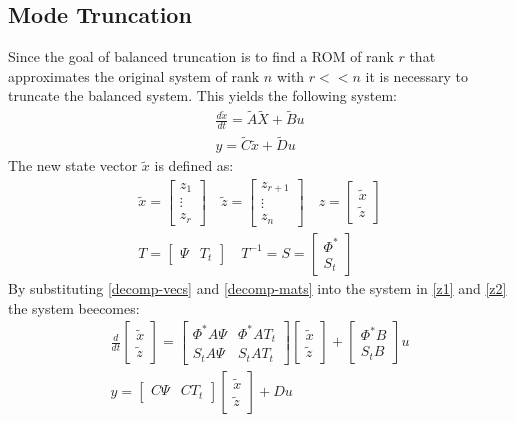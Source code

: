 \subsection{Mode Truncation}
Since the goal of balanced truncation is to find a ROM of rank \(r\) that approximates the original system of rank \(n\) with \(r << n\) it is necessary to truncate the balanced system.
This yields the following system:
\begin{gather}
\frac{d\tilde{x}}{dt} = \tilde{A}\tilde{X} + \tilde{B}u \\
y = \tilde{C}\tilde{x} + \tilde{D}u
\end{gather}
The new state vector \(\tilde{x}\) is defined as:
\begin{gather}
\tilde{x} = \begin{bmatrix}
z_1 \\
\vdots \\
z_r
\end{bmatrix} \quad 
\tilde{z} = \begin{bmatrix}
z_{r+1} \\
\vdots \\
z_n
\end{bmatrix} \quad
z = \begin{bmatrix}
\tilde{x} \\
\tilde{z}
\end{bmatrix} \label{decomp-vecs}\\
T = \begin{bmatrix}
\Psi & T_t
\end{bmatrix} \quad
T^{-1} = S = \begin{bmatrix}
\Phi^{*} \\
S_t
\end{bmatrix} \label{decomp-mats}
\end{gather}
By substituting \ref{decomp-vecs} and \ref{decomp-mats} into the system in \ref{z1} and \ref{z2} the system beecomes:
\begin{gather}
\frac{d}{dt} \begin{bmatrix}
\tilde{x} \\
\tilde{z}
\end{bmatrix} = \begin{bmatrix}
\Phi^{*}A\Psi & \Phi^{*}AT_t \\
S_tA\Psi & S_tAT_t
\end{bmatrix} \begin{bmatrix}
\tilde{x} \\
\tilde{z}
\end{bmatrix}
+ \begin{bmatrix}
\Phi^{*}B \\
S_tB
\end{bmatrix} u \\
y = \begin{bmatrix}
C \Psi & CT_t
\end{bmatrix} \begin{bmatrix}
\tilde{x} \\
\tilde{z}
\end{bmatrix} + Du
\end{gather}
